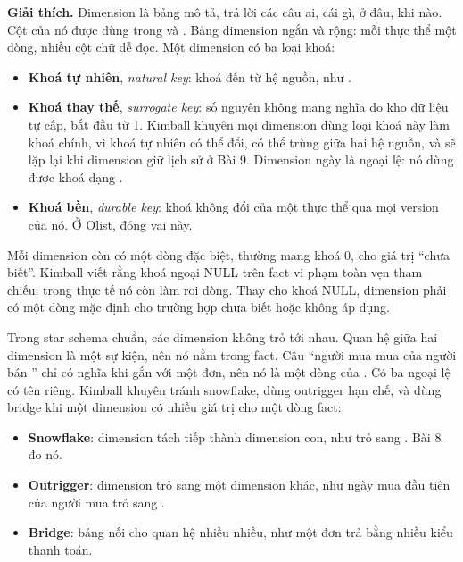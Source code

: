 \textbf{Giải thích.} Dimension là bảng mô tả, trả lời các câu ai, cái gì, ở đâu, khi nào. Cột của nó được dùng trong  và . Bảng dimension ngắn và rộng: mỗi thực thể một dòng, nhiều cột chữ dễ đọc. Một dimension có ba loại khoá:
\begin{itemize}
  \item \textbf{Khoá tự nhiên}, \textit{natural key}: khoá đến từ hệ nguồn, như .
  \item \textbf{Khoá thay thế}, \textit{surrogate key}: số nguyên không mang nghĩa do kho dữ liệu tự cấp, bắt đầu từ 1. Kimball khuyên mọi dimension dùng loại khoá này làm khoá chính, vì khoá tự nhiên có thể đổi, có thể trùng giữa hai hệ nguồn, và sẽ lặp lại khi dimension giữ lịch sử ở Bài 9. Dimension ngày là ngoại lệ: nó dùng được khoá dạng .
  \item \textbf{Khoá bền}, \textit{durable key}: khoá không đổi của một thực thể qua mọi version của nó. Ở Olist,  đóng vai này.
\end{itemize}

Mỗi dimension còn có một dòng đặc biệt, thường mang khoá 0, cho giá trị ``chưa biết''. Kimball viết rằng khoá ngoại NULL trên fact vi phạm toàn vẹn tham chiếu; trong thực tế nó còn làm  rơi dòng. Thay cho khoá NULL, dimension phải có một dòng mặc định cho trường hợp chưa biết hoặc không áp dụng.

Trong star schema chuẩn, các dimension không trỏ tới nhau. Quan hệ giữa hai dimension là một sự kiện, nên nó nằm trong fact. Câu ``người mua  mua của người bán '' chỉ có nghĩa khi gắn với một đơn, nên nó là một dòng của . Có ba ngoại lệ có tên riêng. Kimball khuyên tránh snowflake, dùng outrigger hạn chế, và dùng bridge khi một dimension có nhiều giá trị cho một dòng fact:
\begin{itemize}
  \item \textbf{Snowflake}: dimension tách tiếp thành dimension con, như  trỏ sang . Bài 8 đo nó.
  \item \textbf{Outrigger}: dimension trỏ sang một dimension khác, như ngày mua đầu tiên của người mua trỏ sang .
  \item \textbf{Bridge}: bảng nối cho quan hệ nhiều nhiều, như một đơn trả bằng nhiều kiểu thanh toán.
\end{itemize}

